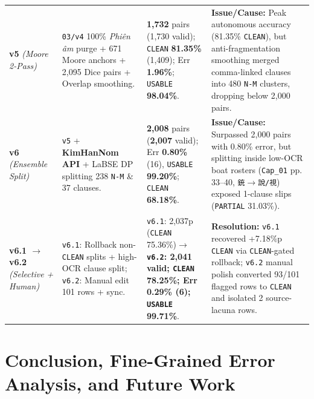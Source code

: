 \documentclass[a4paper]{article}
\begin{document}
\begin{table}[!htb]
\begin{tabularx}{\textwidth}{@{}L{1.80cm} L{3.40cm} L{3.35cm} Y@{}}
\addlinespace[1.1pt]
\textbf{v5} \newline \textit{(Moore 2-Pass)} & \texttt{03/v4} 100\% \textit{Phiên âm} purge + 671 Moore anchors + 2,095 Dice pairs + Overlap smoothing. & \textbf{1,732} pairs (1,730 valid); \texttt{CLEAN} \textbf{81.35\%} (1,409); Err \textbf{1.96\%}; \texttt{USABLE} \textbf{98.04\%}. & \textbf{Issue/Cause:} Peak autonomous accuracy (81.35\% \texttt{CLEAN}), but anti-fragmentation smoothing merged comma-linked clauses into 480 \texttt{N-M} clusters, dropping below 2,000 pairs. \\
\addlinespace[1.1pt]
\textbf{v6} \newline \textit{(Ensemble Split)} & \texttt{v5} + \textbf{KimHanNom API} + LaBSE DP splitting 238 \texttt{N-M} \& 37 clauses. & \textbf{2,008} pairs (\textbf{2,007} valid); Err \textbf{0.80\%} (16), \texttt{USABLE} \textbf{99.20\%}; \texttt{CLEAN} \textbf{68.18\%}. & \textbf{Issue/Cause:} Surpassed 2,000 pairs with 0.80\% error, but splitting inside low-OCR boat rosters (\texttt{Cap\_01} pp.\,33--40, \texttt{銃}$\to$\texttt{說/視}) exposed 1-clause slips (\texttt{PARTIAL} 31.03\%). \\
\addlinespace[1.1pt]
\textbf{v6.1 $\to$ v6.2} \newline \textit{(Selective + Human)} & \texttt{v6.1}: Rollback non-\texttt{CLEAN} splits + high-OCR clause split; \texttt{v6.2}: Manual edit 101 rows + sync. & \texttt{v6.1}: 2,037p (\texttt{CLEAN} 75.36\%)$\to$\textbf{\texttt{v6.2}: 2,041 valid; \texttt{CLEAN} 78.25\%; Err 0.29\% (6); \texttt{USABLE} 99.71\%}. & \textbf{Resolution:} \texttt{v6.1} recovered +7.18\%p \texttt{CLEAN} via \texttt{CLEAN}-gated rollback; \texttt{v6.2} manual polish converted 93/101 flagged rows to \texttt{CLEAN} and isolated 2 source-lacuna rows. \\
\bottomrule
\end{tabularx}
\end{table}

\section{Conclusion, Fine-Grained Error Analysis, and Future Work}
\end{document}
